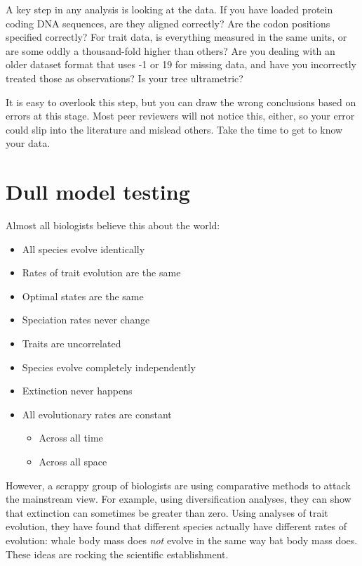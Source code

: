 \documentclass[]{book}
\providecommand{\tightlist}{%
  \setlength{\itemsep}{0pt}\setlength{\parskip}{0pt}}
\theoremstyle{definition}
\theoremstyle{definition}
\theoremstyle{remark}
\begin{document}
A key step in any analysis is looking at the data. If you have loaded
protein coding DNA sequences, are they aligned correctly? Are the codon
positions specified correctly? For trait data, is everything measured in
the same units, or are some oddly a thousand-fold higher than others?
Are you dealing with an older dataset format that uses -1 or 19 for
missing data, and have you incorrectly treated those as observations? Is
your tree ultrametric?

It is easy to overlook this step, but you can draw the wrong conclusions
based on errors at this stage. Most peer reviewers will not notice this,
either, so your error could slip into the literature and mislead others.
Take the time to get to know your data.

\chapter{Dull model testing}\label{dull-model-testing}

Almost all biologists believe this about the world:

\begin{itemize}
\tightlist
\item
  All species evolve identically
\item
  Rates of trait evolution are the same
\item
  Optimal states are the same
\item
  Speciation rates never change
\item
  Traits are uncorrelated
\item
  Species evolve completely independently
\item
  Extinction never happens
\item
  All evolutionary rates are constant

  \begin{itemize}
  \tightlist
  \item
    Across all time
  \item
    Across all space
  \end{itemize}
\end{itemize}

However, a scrappy group of biologists are using comparative methods to
attack the mainstream view. For example, using diversification analyses,
they can show that extinction can sometimes be greater than zero. Using
analyses of trait evolution, they have found that different species
actually have different rates of evolution: whale body mass does
\emph{not} evolve in the same way bat body mass does. These ideas are
rocking the scientific establishment.
\end{document}
